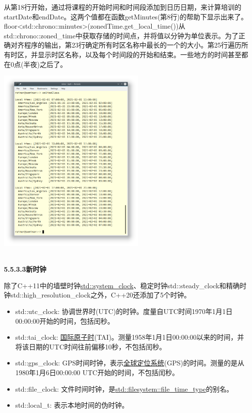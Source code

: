 从第18行开始，通过将课程的开始时间和时间段添加到日历日期，来计算培训的startDate和endDate。这两个值都在函数getMinutes(第8行)的帮助下显示出来了。floor<std::chrono::minutes>(zonedTime.get\_local\_time())从std::chrono::zoned\_time中获取存储的时间点，并将值以分钟为单位表示。为了正确对齐程序的输出，第23行确定所有时区名称中最长的一个的大小。第25行遍历所有时区，并显示时区名称，以及每个时间段的开始和结束。一些地方的时间甚至都在0点(半夜)之后了。

\begin{center}
\includegraphics[width=0.55\textwidth]{content/3/chapter5/images/28.png}\\
\end{center}


\hspace*{\fill} \\ %
\noindent
\textbf{5.5.3.3\hspace{0.2cm}新时钟}

除了C++11中的墙壁时钟\href{https://www.modernescpp.com/index.php/the-three-clocks}{std::system\_clock}、稳定时钟std::steady\_clock和精确时钟std::high\_resolution\_clock之外，C++20还添加了5个时钟。

\begin{itemize}
\item 
std::utc\_clock: 协调世界时(UTC)的时钟。度量自UTC时间1970年1月1日00:00:00开始的时间，包括闰秒。

\item 
std::tai\_clock: \href{https://en.wikipedia.org/wiki/International_Atomic_Time}{国际原子时}(TAI)。测量1958年1月1日00:00:00以来的时间，并将该日期的UTC时间往前偏移10秒，不包括闰秒。

\item 
std::gps\_clock: GPS时间时钟，表示\href{https://en.wikipedia.org/wiki/Global_Positioning_System}{全球定位系统}(GPS)的时间。测量的是从1980年1月6日00:00:00 UTC开始的时间，不包括闰秒。

\item 
std::file\_clock: 文件时间时钟，是\href{https://en.cppreference.com/w/cpp/filesystem/file_time_type}{std::filesystem::file\_time\_type}的别名。

\item 
std::local\_t: 表示本地时间的伪时钟。
\end{itemize}


